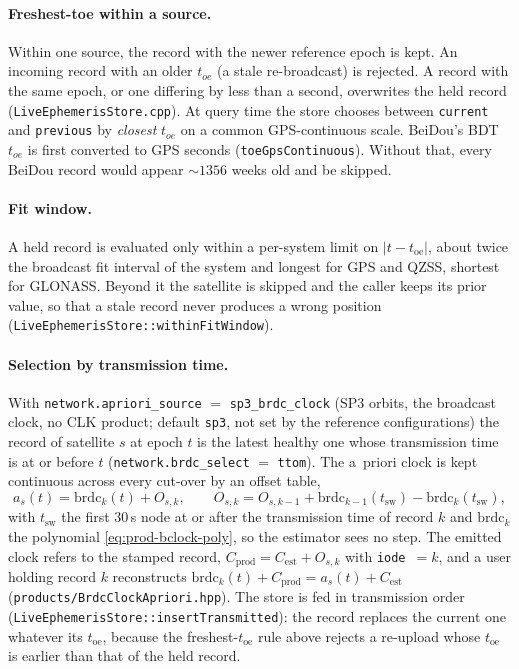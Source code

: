 \documentclass[main.tex]{subfiles}
\begin{document}
\paragraph{Freshest-toe within a source.}
Within one source, the record with the newer reference epoch is kept.
An incoming record with an older $t_{oe}$ (a stale re-broadcast) is
rejected.  A record with the same epoch, or one differing by less than a
second, overwrites the held record (\texttt{LiveEphemerisStore.cpp}).
At query time the store chooses between \texttt{current} and
\texttt{previous} by \emph{closest} $t_{oe}$ on a common GPS-continuous
scale.  BeiDou's BDT $t_{oe}$ is first converted to GPS seconds
(\texttt{toeGpsContinuous}).  Without that, every BeiDou record would
appear $\sim\!1356$ weeks old and be skipped.

\paragraph{Fit window.}
A held record is evaluated only within a per-system limit on
$\lvert t-t_{\mathrm{oe}}\rvert$, about twice the broadcast fit interval of
the system and longest for GPS and QZSS, shortest for GLONASS.  Beyond it
the satellite is skipped and the caller keeps its prior value, so that a
stale record never produces a wrong position
(\texttt{LiveEphemerisStore::withinFitWindow}).

\paragraph{Selection by transmission time.}
With \texttt{network.apriori\_source} $=$ \texttt{sp3\_brdc\_clock} (SP3
orbits, the broadcast clock, no CLK product; default \texttt{sp3}, not set by
the reference configurations) the record of satellite $s$ at epoch $t$ is
the latest healthy one whose transmission time is at or before $t$
(\texttt{network.brdc\_select} $=$ \texttt{ttom}).  The a~priori clock is
kept continuous across every cut-over by an offset table,
\begin{equation}
a_s(t) = \mathrm{brdc}_k(t) + O_{s,k},
\qquad
O_{s,k} = O_{s,k-1} + \mathrm{brdc}_{k-1}(t_{\mathrm{sw}}) - \mathrm{brdc}_{k}(t_{\mathrm{sw}}),
\label{eq:prod-brdc-offset}
\end{equation}
with $t_{\mathrm{sw}}$ the first 30\,s node at or after the transmission
time of record $k$ and $\mathrm{brdc}_k$ the polynomial
\eqref{eq:prod-bclock-poly}, so the estimator sees no step.  The emitted
clock refers to the stamped record, $C_{\mathrm{prod}}=C_{\mathrm{est}}+O_{s,k}$
with \texttt{iode}~$=k$, and a user holding record $k$ reconstructs
$\mathrm{brdc}_k(t)+C_{\mathrm{prod}}=a_s(t)+C_{\mathrm{est}}$
(\texttt{products/BrdcClockApriori.hpp}).  The store is fed in
transmission order (\texttt{LiveEphemerisStore::insertTransmitted}): the
record replaces the current one whatever its $t_{\mathrm{oe}}$, because the
freshest-$t_{\mathrm{oe}}$ rule above rejects a re-upload whose
$t_{\mathrm{oe}}$ is earlier than that of the held record.
\end{document}
